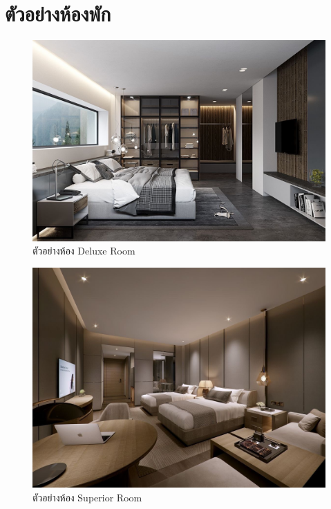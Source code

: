 \documentclass{report}
\begin{document}
\section{ตัวอย่างห้องพัก}
\begin{figure}
    \centering
    \includegraphics[scale=0.2]{Deluxe.jpg}
    \caption{ตัวอย่างห้อง Deluxe Room}
    \label{fig:graph2}
\end{figure}

\begin{figure}
    \centering
    \includegraphics[scale=0.2]{Superior.jpg}
    \caption{ตัวอย่างห้อง Superior Room}
    \label{fig:graph3}
\end{figure}
\end{document}
